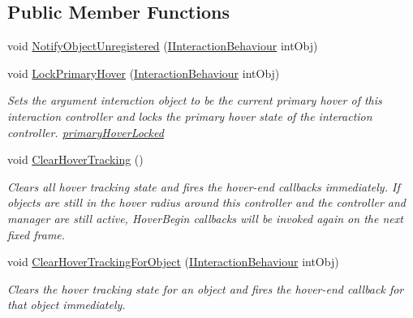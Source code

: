 \subsection*{Public Member Functions}
\begin{DoxyCompactItemize}
\item 
void \mbox{\hyperlink{class_leap_1_1_unity_1_1_interaction_1_1_interaction_controller_a6872fdce5368a5c4eb91f0fc1f0b8930}{Notify\+Object\+Unregistered}} (\mbox{\hyperlink{interface_leap_1_1_unity_1_1_interaction_1_1_i_interaction_behaviour}{I\+Interaction\+Behaviour}} int\+Obj)
\item 
void \mbox{\hyperlink{class_leap_1_1_unity_1_1_interaction_1_1_interaction_controller_a08ba5639e6af985fa056a25ff2981278}{Lock\+Primary\+Hover}} (\mbox{\hyperlink{class_leap_1_1_unity_1_1_interaction_1_1_interaction_behaviour}{Interaction\+Behaviour}} int\+Obj)
\begin{DoxyCompactList}\small\item\em Sets the argument interaction object to be the current primary hover of this interaction controller and locks the primary hover state of the interaction controller. \mbox{\hyperlink{class_leap_1_1_unity_1_1_interaction_1_1_interaction_controller_afa44de31d034ff2bceb41ee6a20d0253}{primary\+Hover\+Locked}} \end{DoxyCompactList}\item 
void \mbox{\hyperlink{class_leap_1_1_unity_1_1_interaction_1_1_interaction_controller_a01f1951bc78ef7b3362df72bfbff4613}{Clear\+Hover\+Tracking}} ()
\begin{DoxyCompactList}\small\item\em Clears all hover tracking state and fires the hover-\/end callbacks immediately. If objects are still in the hover radius around this controller and the controller and manager are still active, Hover\+Begin callbacks will be invoked again on the next fixed frame. \end{DoxyCompactList}\item 
void \mbox{\hyperlink{class_leap_1_1_unity_1_1_interaction_1_1_interaction_controller_a9de6995d8a1409d6ac9ea3520eb7d0c4}{Clear\+Hover\+Tracking\+For\+Object}} (\mbox{\hyperlink{interface_leap_1_1_unity_1_1_interaction_1_1_i_interaction_behaviour}{I\+Interaction\+Behaviour}} int\+Obj)
\begin{DoxyCompactList}\small\item\em Clears the hover tracking state for an object and fires the hover-\/end callback for that object immediately. \end{DoxyCompactList}\item 

\end{DoxyCompactItemize}
